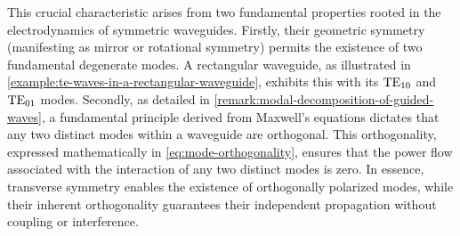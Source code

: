 \documentclass[11pt,a4paper,twoside,openany]{report}
\begin{document}
This crucial characteristic arises from two fundamental properties rooted in the electrodynamics of symmetric waveguides. Firstly, their geometric symmetry (manifesting as mirror or rotational symmetry) permits the existence of two fundamental degenerate modes. A rectangular waveguide, as illustrated in \cref{example:te-waves-in-a-rectangular-waveguide}, exhibits this with its $\text{TE}_{10}$ and $\text{TE}_{01}$ modes. Secondly, as detailed in \cref{remark:modal-decomposition-of-guided-waves}, a fundamental principle derived from Maxwell's equations dictates that any two distinct modes within a waveguide are orthogonal. This orthogonality, expressed mathematically in \cref{eq:mode-orthogonality}, ensures that the power flow associated with the interaction of any two distinct modes is zero. In essence, transverse symmetry enables the existence of orthogonally polarized modes, while their inherent orthogonality guarantees their independent propagation without coupling or interference.
\end{document}
